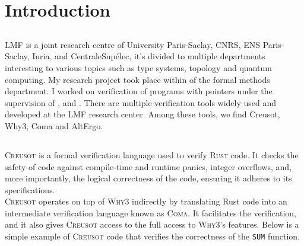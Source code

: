 \documentclass[12pt,a4paper]{report}
\begin{document}
\renewcommand\bibname{References} 


% 

\tableofcontents


\newpage
{} 

\chapter{Introduction}

\section{}
LMF is a joint research centre of University Paris-Saclay, CNRS, ENS Paris-Saclay, Inria, and CentraleSupélec, it's divided to multiple departments interesting to various topics such as type systems, topology and quantum computing. My research project took place within  of the formal methods department. I worked on verification of programs with pointers under the supervision of ,  and .
There are multiple verification tools widely used and developed at the LMF research center. Among these tools, we find Creusot, Why3, Coma and AltErgo. 

\section{}
\textsc{Creusot} is a formal verification language used to verify \textsc{Rust} code. It checks the safety of code against compile-time and runtime panics, integer overflows, and, more importantly, the logical correctness of the code, ensuring it adheres to its specifications.\\
\textsc{Creusot} operates on top of \textsc{Why3} indirectly by translating Rust code into an intermediate verification language known as \textsc{Coma}. It facilitates the verification, and it also gives \textsc{Creusot} access to the full access to \textsc{Why3}'s features.
Below is a simple example of \textsc{Creusot} code that verifies the correctness of the \texttt{SUM} function.
\newpage
\end{document}
